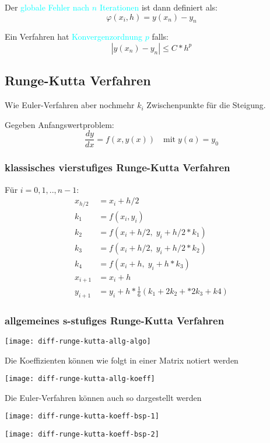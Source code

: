 Der \textcolor{cyan}{globale Fehler nach $n$ Iterationen} ist dann definiert als:
$$\varphi(x_i, h) = y(x_n) - y_n$$

Ein Verfahren hat \textcolor{cyan}{Konvergenzordnung $p$} falls:
$$|y(x_n) - y_n| \le C * h^p$$










\subsection{Runge-Kutta Verfahren}

Wie Euler-Verfahren aber nochmehr $k_i$ Zwischenpunkte für die Steigung.

Gegeben Anfangswertproblem:
$$\frac{dy}{dx} = f(x, y(x)) \quad \mathrm{mit} \; y(a) = y_0$$


\subsubsection{klassisches vierstufiges Runge-Kutta Verfahren}


\begingroup
\addtolength{\jot}{0.5em}
\large
Für $i = 0,1,..,n-1$:
\begin{align*}
	x_{h/2} & = x_i + h/2                                       \\
	k_1     & = f(x_i, y_i)                                     \\
	k_2     & = f(x_i + h/2, \; y_i + h/2 * k_1)                \\
	k_3     & = f(x_i + h/2, \; y_i + h/2 * k_2)                \\
	k_4     & = f(x_i + h, \; y_i + h * k_3)                    \\
	x_{i+1} & = x_i + h                                         \\
	y_{i+1} & = y_i + h * \frac{1}{6}(k_1 + 2k_2 + * 2k_3 + k4)
\end{align*}
\endgroup


\subsubsection{allgemeines s-stufiges Runge-Kutta Verfahren}


\texttt{[image: diff-runge-kutta-allg-algo]}

Die Koeffizienten können wie folgt in einer Matrix notiert werden

\begin{center}
	\texttt{[image: diff-runge-kutta-allg-koeff]}
\end{center}


Die Euler-Verfahren können auch so dargestellt werden

\begin{minipage}{0.35\linewidth}
	\texttt{[image: diff-runge-kutta-koeff-bsp-1]}
\end{minipage}
\hfill
\begin{minipage}{0.55\linewidth}
	\texttt{[image: diff-runge-kutta-koeff-bsp-2]}
\end{minipage}



